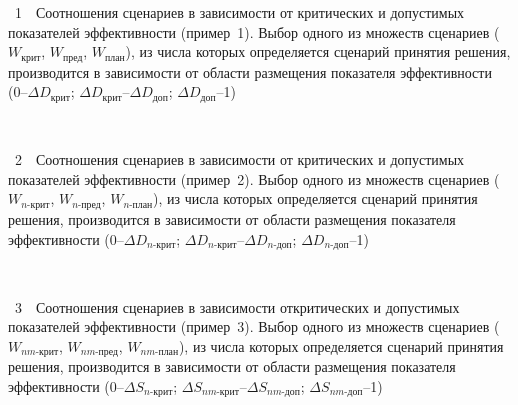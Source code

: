 \begin{multicols}{2}
\noindent
{{\figurename~1}\ \ \small{Соотношения сценариев в зависимости от критических и допустимых показателей
эффек\-тив\-ности (пример~1). Выбор одного из множеств сценариев ($W_{\mathrm{крит}}$,
$W_{\mathrm{пред}}$, $W_{\mathrm{план}}$), из числа которых определяется сценарий принятия
решения, производится в за\-ви\-си\-мости от об\-ласти размещения показателя
эффективности\protect\linebreak
(0--$\Delta D_{\mathrm{крит}}$;
$\Delta D_{\mathrm{крит}}$--$\Delta D_{\mathrm{доп}}$;
$\Delta D_{\mathrm{доп}}$--1)}}


\vspace*{12pt}

\begin{center}  %
\vspace*{2pt}
\mbox{%
\epsfxsize=77.526mm
}
\end{center}

  \vspace*{2pt}

\noindent
{{\figurename~2}\ \ \small{Соотношения сценариев в зависимости от критических и допустимых показателей
эф\-фек\-тив\-ности (пример~2). Выбор одного из множеств сценариев ($W_{n\mbox{-}\mathrm{крит}}$,
$W_{n\mbox{-}\mathrm{пред}}$, $W_{n\mbox{-}\mathrm{план}}$), из числа которых определяется сценарий принятия
решения, производится в за\-ви\-си\-мости от об\-ласти размещения показателя эффективности\linebreak
(0--$\Delta D_{n\mbox{-}\mathrm{крит}}$;
$\Delta D_{n\mbox{-}\mathrm{крит}}$--$\Delta D_{n\mbox{-}\mathrm{доп}}$;
$\Delta D_{n\mbox{-}\mathrm{доп}}$--1)}}


\vspace*{12pt}


\begin{center}  %
\vspace*{2pt}
\mbox{%
\epsfxsize=77.526mm
}
\end{center}

  \vspace*{2pt}

\noindent
{{\figurename~3}\ \ \small{Соотношения сценариев в зависимости от\protect\linebreak критических и допустимых показателей
эф\-фек\-тив\-ности (пример~3). Выбор одного из множеств сценариев ($W_{nm\mbox{-}\mathrm{крит}}$,
$W_{nm\mbox{-}\mathrm{пред}}$, $W_{nm\mbox{-}\mathrm{план}}$), из числа которых определяется сценарий принятия
решения, производится в зависимости от об\-ласти размещения показателя эф\-фек\-тив\-ности
(0--$\Delta S_{n\mbox{-}\mathrm{крит}}$;
$\Delta S_{nm\mbox{-}\mathrm{крит}}$--$\Delta S_{nm\mbox{-}\mathrm{доп}}$;
$\Delta S_{nm\mbox{-}\mathrm{доп}}$--1)}}



\end{multicols}
